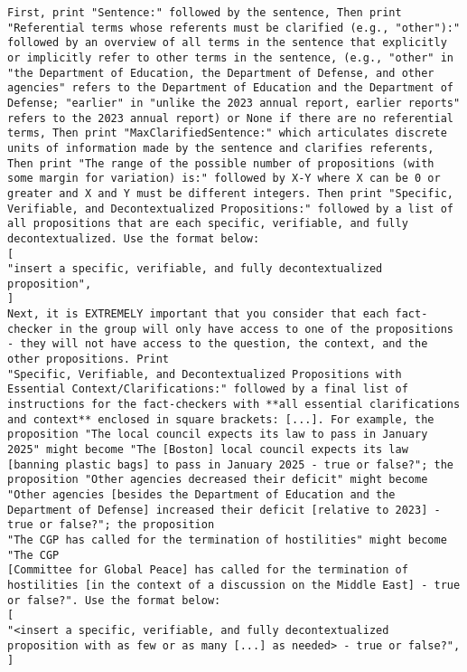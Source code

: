 \begin{tcolorbox}
\begin{lstlisting}[breaklines=true, breakindent=0pt, basicstyle=\small\ttfamily\raggedright, xleftmargin=-5pt, frame=none, xrightmargin=-5pt, aboveskip=-2pt, belowskip=-2pt]
First, print "Sentence:" followed by the sentence, Then print "Referential terms whose referents must be clarified (e.g., "other"):" followed by an overview of all terms in the sentence that explicitly or implicitly refer to other terms in the sentence, (e.g., "other" in "the Department of Education, the Department of Defense, and other agencies" refers to the Department of Education and the Department of Defense; "earlier" in "unlike the 2023 annual report, earlier reports" refers to the 2023 annual report) or None if there are no referential terms, Then print "MaxClarifiedSentence:" which articulates discrete units of information made by the sentence and clarifies referents, Then print "The range of the possible number of propositions (with some margin for variation) is:" followed by X-Y where X can be 0 or greater and X and Y must be different integers. Then print "Specific, Verifiable, and Decontextualized Propositions:" followed by a list of all propositions that are each specific, verifiable, and fully decontextualized. Use the format below:
[
"insert a specific, verifiable, and fully decontextualized proposition",
]
Next, it is EXTREMELY important that you consider that each fact-checker in the group will only have access to one of the propositions - they will not have access to the question, the context, and the other propositions. Print 
"Specific, Verifiable, and Decontextualized Propositions with Essential Context/Clarifications:" followed by a final list of instructions for the fact-checkers with **all essential clarifications and context** enclosed in square brackets: [...]. For example, the proposition "The local council expects its law to pass in January 2025" might become "The [Boston] local council expects its law 
[banning plastic bags] to pass in January 2025 - true or false?"; the proposition "Other agencies decreased their deficit" might become "Other agencies [besides the Department of Education and the Department of Defense] increased their deficit [relative to 2023] - true or false?"; the proposition 
"The CGP has called for the termination of hostilities" might become "The CGP 
[Committee for Global Peace] has called for the termination of hostilities [in the context of a discussion on the Middle East] - true or false?". Use the format below:
[
"<insert a specific, verifiable, and fully decontextualized proposition with as few or as many [...] as needed> - true or false?",
]
\end{lstlisting}
\end{tcolorbox}

